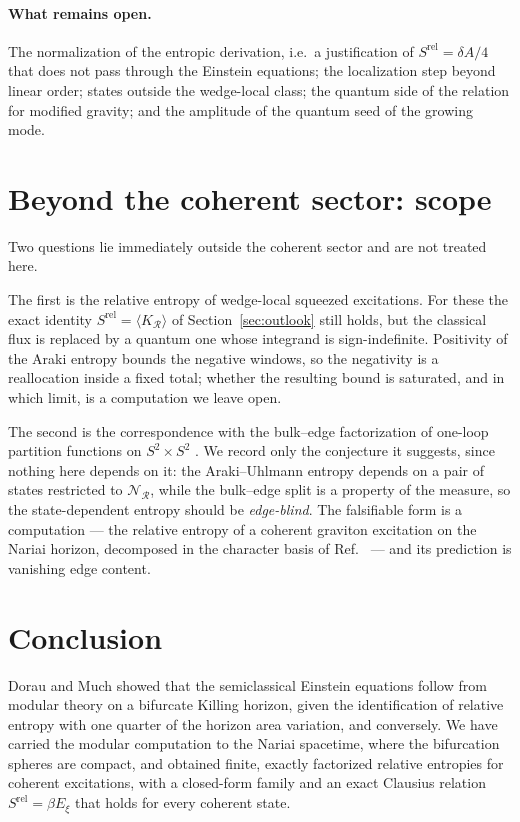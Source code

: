 \documentclass[11pt]{article}
\newcommand{\Srel}{S^{\mathrm{rel}}}
\newcommand{\Nariai}{Nariai}
\begin{document}
\paragraph{What remains open.} The normalization of the entropic derivation, i.e.\ a justification of $\Srel=\delta A/4$ that does not pass through the Einstein equations; the localization step beyond linear order; states outside the wedge-local class; the quantum side of the relation for modified gravity; and the amplitude of the quantum seed of the growing mode.


\section{Beyond the coherent sector: scope}
\label{sec:scope}

Two questions lie immediately outside the coherent sector and are not treated here.

The first is the relative entropy of wedge-local squeezed excitations. For these the exact identity $\Srel=\langle K_{\mathcal R}\rangle$ of Section~\ref{sec:outlook} still holds, but the classical flux is replaced by a quantum one whose integrand is sign-indefinite. Positivity of the Araki entropy bounds the negative windows, so the negativity is a reallocation inside a fixed total; whether the resulting bound is saturated, and in which limit, is a computation we leave open.

The second is the correspondence with the bulk--edge factorization of one-loop partition functions on $S^2 \times S^2$ \cite{LawLochabPRL,LawLochabPRD}. We record only the conjecture it suggests, since nothing here depends on it: the Araki--Uhlmann entropy depends on a pair of states restricted to $\mathscr{N}_{\mathcal{R}}$, while the bulk--edge split is a property of the measure, so the state-dependent entropy should be \emph{edge-blind}. The falsifiable form is a computation --- the relative entropy of a coherent graviton excitation on the \Nariai{} horizon, decomposed in the character basis of Ref.~\cite{Mukherjee} --- and its prediction is vanishing edge content.

\section{Conclusion}
\label{sec:conclusion}

Dorau and Much showed that the semiclassical Einstein equations follow from modular theory on a bifurcate Killing horizon, given the identification of relative entropy with one quarter of the horizon area variation, and conversely. We have carried the modular computation to the Nariai spacetime, where the bifurcation spheres are compact, and obtained finite, exactly factorized relative entropies for coherent excitations, with a closed-form family and an exact Clausius relation $\Srel=\beta E_\xi$ that holds for every coherent state.
\end{document}
